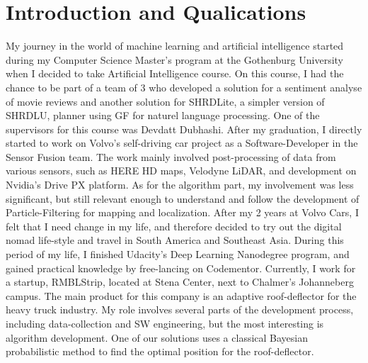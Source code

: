 \documentclass[12pt]{article}
\begin{document}
\maketitle

\section*{Introduction and Qualications}
My journey in the world of machine learning and artificial intelligence started during my Computer Science Master's program at the Gothenburg University when I decided to take Artificial Intelligence course. On this course, I had the chance to be part of a team of 3 who developed a solution for a sentiment analyse of movie reviews and another solution for SHRDLite, a simpler version of SHRDLU\cite{win1970shrdlu}, planner using GF for naturel language processing. One of the supervisors for this course was Devdatt Dubhashi.
After my graduation, I directly started to work on Volvo's self-driving car project as a Software-Developer in the Sensor Fusion team. The work mainly involved post-processing of data from various sensors, such as HERE HD maps, Velodyne LiDAR, and development on Nvidia's Drive PX platform. As for the algorithm part, my involvement was less significant, but still relevant enough to understand and follow the development of Particle-Filtering for mapping and localization.
After my 2 years at Volvo Cars, I felt that I need change in my life, and therefore decided to try out the digital nomad life-style and travel in South America and Southeast Asia. During this period of my life, I finished Udacity's Deep Learning Nanodegree program, and gained practical knowledge by free-lancing on Codementor.
Currently, I work for a startup, RMBLStrip, located at Stena Center, next to Chalmer's Johanneberg campus. The main product for this company is an adaptive roof-deflector for the heavy truck industry. My role involves several parts of the development process, including data-collection and SW engineering, but the most interesting is algorithm development. One of our solutions uses a classical Bayesian probabilistic method to find the optimal position for the roof-deflector.
\end{document}
